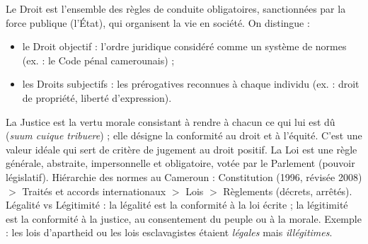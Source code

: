 \documentclass[11pt]{article}
\newcommand{\cle}[1]{{\popxbold\color{popdark}#1}}
\begin{document}
\begin{definition}
Le \cle{Droit} est l'ensemble des règles de conduite obligatoires, sanctionnées par la force publique (l'État), qui organisent la vie en société. On distingue :
\begin{itemize}
  \item le \cle{Droit objectif} : l'ordre juridique considéré comme un système de normes (ex. : le Code pénal camerounais) ;
  \item les \cle{Droits subjectifs} : les prérogatives reconnues à chaque individu (ex. : droit de propriété, liberté d'expression).
\end{itemize}
La \cle{Justice} est la vertu morale consistant à rendre à chacun ce qui lui est dû (\emph{suum cuique tribuere}) ; elle désigne la conformité au droit et à l'équité. C'est une valeur idéale qui sert de critère de jugement au droit positif.
La \cle{Loi} est une règle générale, abstraite, impersonnelle et obligatoire, votée par le Parlement (pouvoir législatif). Hiérarchie des normes au Cameroun : Constitution (1996, révisée 2008) $>$ Traités et accords internationaux $>$ Lois $>$ Règlements (décrets, arrêtés).
\cle{Légalité} vs \cle{Légitimité} : la légalité est la conformité à la loi écrite ; la légitimité est la conformité à la justice, au consentement du peuple ou à la morale. Exemple : les lois d'apartheid ou les lois esclavagistes étaient \emph{légales} mais \emph{illégitimes}.
\end{definition}
\end{document}
